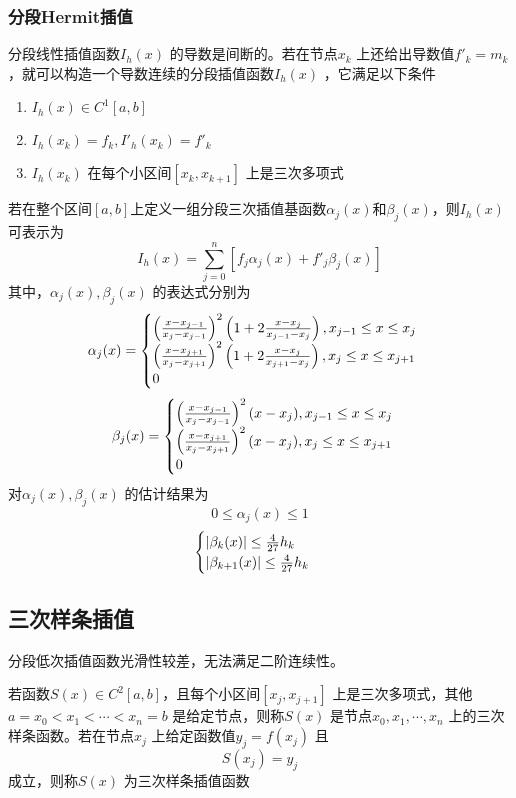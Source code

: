 \documentclass[a4paper]{article}
\begin{document}
\subsubsection{分段Hermit插值}
分段线性插值函数$I_h(x)$ 的导数是间断的。若在节点$x_{k}$ 上还给出导数值$f'_k = m_k$，就可以构造一个导数连续的分段插值函数$I_h(x)$ ，它满足以下条件
\begin{enumerate}
	\item $I_h(x) \in C^1[a,b]$ 
	\item $I_h(x_{k}) = f_k, I'_h(x_{k}) = f'_k$ 
	\item $I_h(x_{k})$ 在每个小区间$[x_{k}, x_{k+1}]$ 上是三次多项式
\end{enumerate}
若在整个区间$[a,b]$上定义一组分段三次插值基函数$\alpha_j(x)$和$\beta_j(x)$，则$I_h(x)$ 可表示为
\[
	I_h(x) = \sum_{j=0}^{n} [f_j \alpha_j (x) + f'_j \beta_j (x)]
\] 
其中，$\alpha_j(x),\beta_j(x)$ 的表达式分别为
\[
 \notag
	\alpha_j(x) = 
	\begin{cases}
		\left( \frac{x-x_{j-1}}{x_{j} - x_{j-1}} \right)^2 \left( 1 + 2 \frac{x - x_{j}}{x_{j-1} - x_{j}} \right) , x_{j-1} \le x \le x_{j} \\
		\left( \frac{x-x_{j+1}}{x_{j} - x_{j+1}} \right)^2 \left( 1 + 2 \frac{x - x_{j}}{x_{j+1} - x_{j}} \right), x_{j} \le x \le x_{j+1}\\
		0
	\end{cases}
\] 
\[
    \notag
	\beta_j(x) = 
	\begin{cases}
		\left( \frac{x-x_{j-1}}{x_{j} - x_{j-1}} \right)^2 (x - x_{j}) , x_{j-1} \le x \le x_{j} \\
		\left( \frac{x-x_{j+1}}{x_{j} - x_{j+1}} \right)^2 (x - x_{j}), x_{j} \le x \le x_{j+1}\\
		0
	\end{cases}
\] 
对$\alpha_j(x),\beta_j(x)$ 的估计结果为
\[
0 \le \alpha_j(x) \le 1
\] 
\[
    \notag
    \begin{cases}
     |\beta_k(x)| \le \frac{4}{27}h_k \\
     |\beta_{k+1}(x)| \le  \frac{4}{27} h_k
    \end{cases}	
\] 

\subsection{三次样条插值}
分段低次插值函数光滑性较差，无法满足二阶连续性。

\begin{definition}
	若函数$S(x) \in C^2[a,b]$，且每个小区间$[x_{j}, x_{j+1}]$ 上是三次多项式，其他$a = x_0 < x_1 < \cdots < x_{n} = b$ 是给定节点，则称$S(x)$ 是节点$x_0,x_1,\cdots,x_{n}$ 上的三次样条函数。若在节点$x_{j}$ 上给定函数值$y_{j} = f(x_{j})$ 且
	\[
	S(x_{j}) = y_{j}
	\] 
	成立，则称$S(x)$ 为三次样条插值函数
\end{definition}
\end{document}
